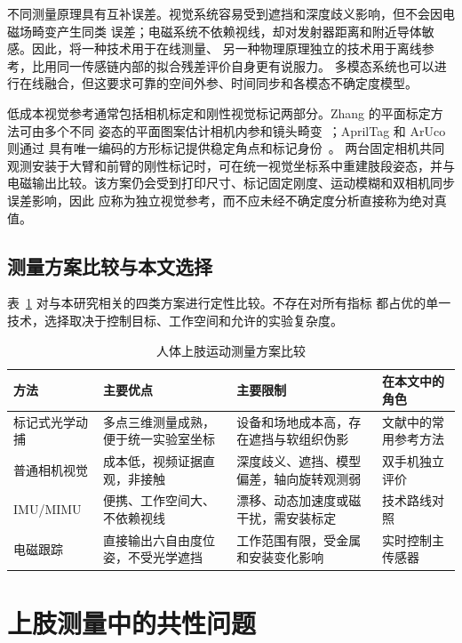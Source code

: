 不同测量原理具有互补误差。视觉系统容易受到遮挡和深度歧义影响，但不会因电磁场畸变产生同类
误差；电磁系统不依赖视线，却对发射器距离和附近导体敏感。因此，将一种技术用于在线测量、
另一种物理原理独立的技术用于离线参考，比用同一传感链内部的拟合残差评价自身更有说服力。
多模态系统也可以进行在线融合，但这要求可靠的空间外参、时间同步和各模态不确定度模型。

低成本视觉参考通常包括相机标定和刚性视觉标记两部分。Zhang 的平面标定方法可由多个不同
姿态的平面图案估计相机内参和镜头畸变~\cite{zhang2000flexible}；AprilTag 和 ArUco 则通过
具有唯一编码的方形标记提供稳定角点和标记身份~\cite{olson2011apriltag,garrido2014aruco}。
两台固定相机共同观测安装于大臂和前臂的刚性标记时，可在统一视觉坐标系中重建肢段姿态，并与
电磁输出比较。该方案仍会受到打印尺寸、标记固定刚度、运动模糊和双相机同步误差影响，因此
应称为独立视觉参考，而不应未经不确定度分析直接称为绝对真值。

\subsection{测量方案比较与本文选择}
\label{subsec:ch2_sensing_comparison}

表~\ref{tab:ch2_sensing_comparison} 对与本研究相关的四类方案进行定性比较。不存在对所有指标
都占优的单一技术，选择取决于控制目标、工作空间和允许的实验复杂度。

\begin{table}[htbp]
  \centering
  \caption{人体上肢运动测量方案比较}
  \label{tab:ch2_sensing_comparison}
  \begin{tabularx}{\linewidth}{@{}lXXX@{}}
    \toprule
    方法 & 主要优点 & 主要限制 & 在本文中的角色 \\
    \midrule
    标记式光学动捕 & 多点三维测量成熟，便于统一实验室坐标 & 设备和场地成本高，存在遮挡与软组织伪影 & 文献中的常用参考方法 \\
    普通相机视觉 & 成本低，视频证据直观，非接触 & 深度歧义、遮挡、模型偏差，轴向旋转观测弱 & 双手机独立评价 \\
    IMU/MIMU & 便携、工作空间大、不依赖视线 & 漂移、动态加速度或磁干扰，需安装标定 & 技术路线对照 \\
    电磁跟踪 & 直接输出六自由度位姿，不受光学遮挡 & 工作范围有限，受金属和安装变化影响 & 实时控制主传感器 \\
    \bottomrule
  \end{tabularx}
\end{table}

\section{上肢测量中的共性问题}
\label{sec:ch2_common_challenges}

